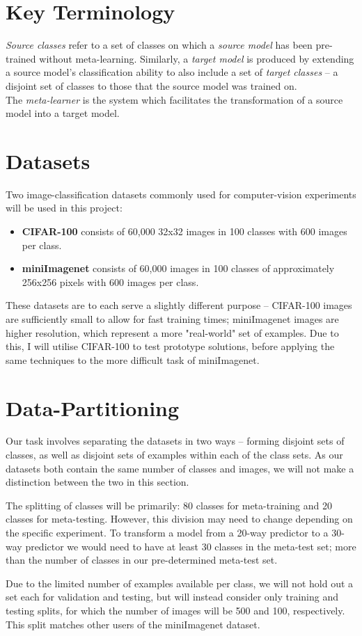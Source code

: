 \documentclass{report}
\begin{document}
	\section{Key Terminology}
	\textit{Source classes} refer to a set of classes on which a \textit{source model} has been pre-trained without meta-learning. Similarly, a \textit{target model} is produced by extending a source model's classification ability to also include a set of \textit{target classes} -- a disjoint set of classes to those that the source model was trained on. \\
	The \textit{meta-learner} is the system which facilitates the transformation of a source model into a target model. 
	
	\section{Datasets}
	Two image-classification datasets commonly used for computer-vision experiments will be used in this project:
	\begin{itemize}
		\item \textbf{CIFAR-100}\parencite{cifar100} consists of 60,000 32x32 images in 100 classes with 600 images per class. 
		\item \textbf{miniImagenet}\parencite{ilsvr} consists of 60,000 images in 100 classes of approximately 256x256 pixels with 600 images per class.
	\end{itemize}
	These datasets are to each serve a slightly different purpose -- CIFAR-100 images are sufficiently small to allow for fast training times; miniImagenet images are higher resolution, which represent a more "real-world" set of examples. Due to this, I will utilise CIFAR-100 to test prototype solutions, before applying the same techniques to the more difficult task of miniImagenet. \par 

	\section{Data-Partitioning}
	Our task involves separating the datasets in two ways -- forming disjoint sets of classes, as well as disjoint sets of examples within each of the class sets. As our datasets both contain the same number of classes and images, we will not make a distinction between the two in this section. \par
	The splitting of classes will be primarily: 80 classes for meta-training and 20 classes for meta-testing. However, this division may need to change depending on the specific experiment. To transform a model from a 20-way predictor to a 30-way predictor we would need to have at least 30 classes in the meta-test set; more than the number of classes in our pre-determined meta-test set. \par
	Due to the limited number of examples available per class, we will not hold out a set each for validation and testing, but will instead consider only training and testing splits, for which the number of images will be 500 and 100, respectively. This split matches other users of the miniImagenet dataset. \par
	
\end{document}
